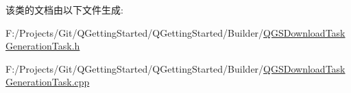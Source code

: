 该类的文档由以下文件生成\+:\begin{DoxyCompactItemize}
\item 
F\+:/\+Projects/\+Git/\+Q\+Getting\+Started/\+Q\+Getting\+Started/\+Builder/\mbox{\hyperlink{_q_g_s_download_task_generation_task_8h}{Q\+G\+S\+Download\+Task\+Generation\+Task.\+h}}\item 
F\+:/\+Projects/\+Git/\+Q\+Getting\+Started/\+Q\+Getting\+Started/\+Builder/\mbox{\hyperlink{_q_g_s_download_task_generation_task_8cpp}{Q\+G\+S\+Download\+Task\+Generation\+Task.\+cpp}}\end{DoxyCompactItemize}
